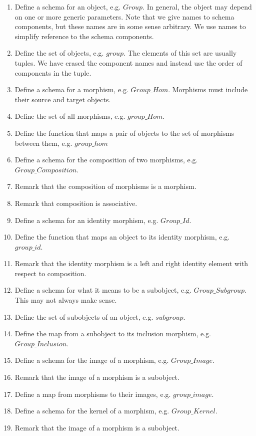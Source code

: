 \documentclass{amsart}
\begin{document}
\begin{enumerate}
	\item Define a schema for an object, e.g. $Group$. 
	In general, the object may depend on one or more generic parameters. 
	Note that we give names to schema components, but these names are in some sense arbitrary. 
	We use names to simplify reference to the schema components.
	\item Define the set of objects, e.g. $group$. 
	The elements of this set are usually tuples. 
	We have erased the component names and instead use the order of components in the tuple.
	\item Define a schema for a morphism, e.g. $Group\_Hom$.
	Morphisms must include their source and target objects.
	\item Define the set of all morphisms, e.g. $group\_Hom$.
	\item Define the function that maps a pair of objects to the set of morphisms between them,
	e.g. $group\_hom$
	\item Define a schema for the composition of two morphisms, e.g. $Group\_Composition$.
	\item Remark that the composition of morphisms is a morphism.
	\item Remark that composition is associative.
	\item Define a schema for an identity morphism, e.g. $Group\_Id$.
	\item Define the function that maps an object to its identity morphism, e.g. $group\_id$.
	\item Remark that the identity morphism is a left and right identity element with respect to
	composition.
	\item Define a schema for what it means to be a subobject, e.g. $Group\_Subgroup$. 
	This may not always make sense.
	\item Define the set of subobjects of an object, e.g. $subgroup$.
	\item Define the map from a subobject to its inclusion morphism, e.g. $Group\_Inclusion$.
	\item Define a schema for the image of a morphism, e.g. $Group\_Image$.
	\item Remark that the image of a morphism is a subobject.
	\item Define a map from morphisms to their images, e.g. $group\_image$.
	\item Define a schema for the kernel of a morphism, e.g. $Group\_Kernel$.
	\item Remark that the image of a morphism is a subobject.

\end{enumerate}
\end{document}
